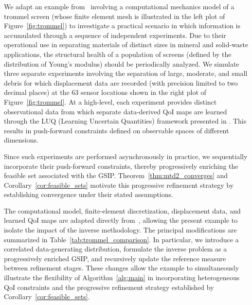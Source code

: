 \documentclass{article}
\newcounter{example}[section]
\begin{document}
We adapt an example from~\cite{RHB25} involving a computational mechanics model of a trommel screen (whose finite element mesh is illustrated in the left plot of Figure~\ref{fig:trommel}) to investigate a practical scenario in which information is accumulated through a sequence of independent experiments.
Due to their operational use in separating materials of distinct sizes in mineral and solid-waste applications, the structural health of a population of screens (defined by the distribution of Young's modulus) should be periodically analyzed.
We simulate three separate experiments involving the separation of large, moderate, and small debris for which displacement data are recorded (with precision limited to two decimal places) at the 63 sensor locations shown in the right plot of Figure~\ref{fig:trommel}.
At a high-level, each experiment provides distinct observational data from which separate data-derived QoI maps are learned through the LUQ (Learning Uncertain Quantities) framework presented in \cite{RHB25}.
This results in push-forward constraints defined on observable spaces of different dimensions.

Since such experiments are performed asynchronously in practice, we sequentially incorporate their push-forward constraints, thereby progressively enriching the feasible set associated with the GSIP.
Theorem~\ref{thm:mtd2_converges} and Corollary~\ref{cor:feasible_sets} motivate this progressive refinement strategy by establishing convergence under their stated assumptions.

The computational model, finite-element discretization, displacement data, and learned QoI maps are adapted directly from~\cite{RHB25}, allowing the present example to isolate the impact of the inverse methodology.
The principal modifications are summarized in Table~\ref{tab:trommel_comparison}.
In particular, we introduce a correlated data-generating distribution, formulate the inverse problem as a progressively enriched GSIP, and recursively update the reference measure between refinement stages.
These changes allow the example to simultaneously illustrate the flexibility of Algorithm~\ref{alg:main} in incorporating heterogeneous QoI constraints and the progressive refinement strategy established by Corollary~\ref{cor:feasible_sets}.
\end{document}
